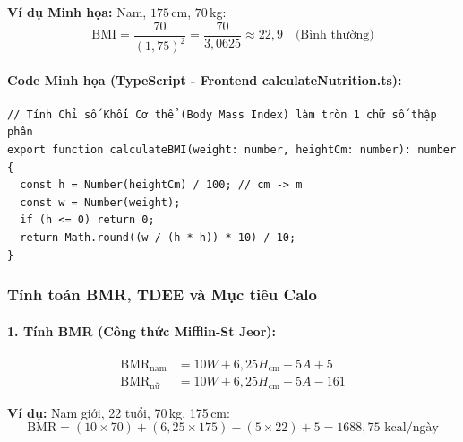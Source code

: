 \documentclass[12pt,a4paper]{article}
\begin{document}
\noindent\textbf{Ví dụ Minh họa:} Nam, $175$\,cm, $70$\,kg:
\begin{equation}
    \text{BMI} = \frac{70}{(1{,}75)^{2}} = \frac{70}{3{,}0625} \approx 22{,}9 \quad \text{(Bình thường)}
\end{equation}

\paragraph{Code Minh họa (TypeScript - Frontend calculateNutrition.ts):}
\begin{verbatim}
// Tính Chỉ số Khối Cơ thể (Body Mass Index) làm tròn 1 chữ số thập phân
export function calculateBMI(weight: number, heightCm: number): number {
  const h = Number(heightCm) / 100; // cm -> m
  const w = Number(weight);
  if (h <= 0) return 0;
  return Math.round((w / (h * h)) * 10) / 10;
}
\end{verbatim}

\subsubsection{Tính toán BMR, TDEE và Mục tiêu Calo}

\paragraph{1. Tính BMR (Công thức Mifflin-St Jeor):}
\begin{align}
    \text{BMR}_{\text{nam}}  &= 10W + 6{,}25H_{\text{cm}} - 5A + 5    \label{eq:bmr_m} \\
    \text{BMR}_{\text{nữ}}   &= 10W + 6{,}25H_{\text{cm}} - 5A - 161  \label{eq:bmr_f}
\end{align}

\noindent\textbf{Ví dụ:} Nam giới, 22 tuổi, 70\,kg, 175\,cm:
\begin{equation}
    \text{BMR} = (10 \times 70) + (6{,}25 \times 175) - (5 \times 22) + 5 = 1688{,}75 \text{ kcal/ngày}
\end{equation}
\end{document}
